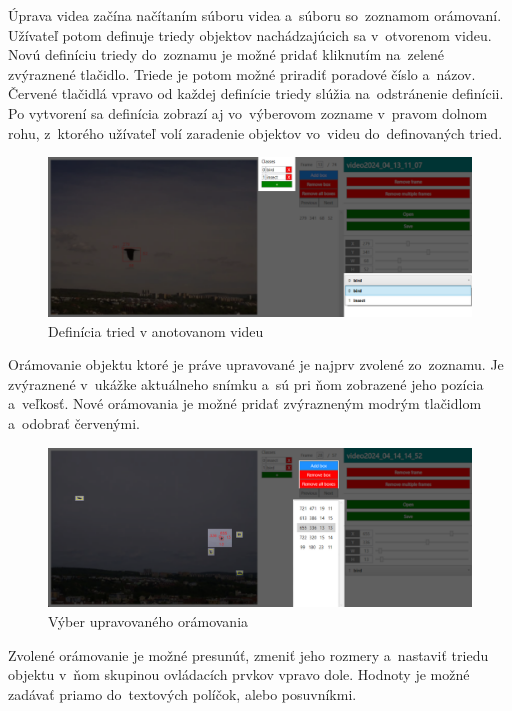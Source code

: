        Úprava videa začína načítaním súboru videa a~súboru so~zoznamom orámovaní. Užívateľ potom definuje triedy objektov nachádzajúcich sa v~otvorenom videu. Novú definíciu triedy do~zoznamu je možné pridať kliknutím na~zelené zvýraznené tlačidlo. Triede je potom možné priradiť poradové číslo a~názov. Červené tlačidlá vpravo od každej definície triedy slúžia na~odstránenie definícii. Po vytvorení sa definícia zobrazí aj vo~výberovom zozname v~pravom dolnom rohu, z~ktorého užívateľ volí zaradenie objektov vo~videu do~definovaných tried.

        \begin{figure}[H]
            \centering
            \includegraphics[width=\textwidth]{obrazky/video_annotator/class_definition.png}
            \caption{Definícia tried v anotovanom videu}
        \end{figure}

        Orámovanie objektu ktoré je práve upravované je najprv zvolené zo~zoznamu. Je zvýraznené v~ukážke aktuálneho snímku a~sú pri ňom zobrazené jeho pozícia a~veľkosť. Nové orámovania je možné pridať zvýrazneným modrým tlačidlom a~odobrať červenými.

        \begin{figure}[H]
            \centering
            \includegraphics[width=\textwidth]{obrazky/video_annotator/bbox_select.png}
            \caption{Výber upravovaného orámovania}
        \end{figure}

        Zvolené orámovanie je možné presunúť, zmeniť jeho rozmery a~nastaviť triedu objektu v~ňom skupinou ovládacích prvkov vpravo dole. Hodnoty je možné zadávať priamo do~textových políčok, alebo posuvníkmi.

